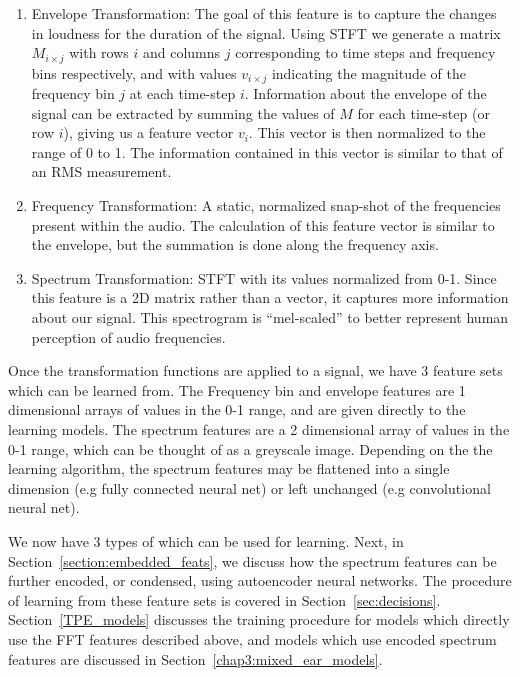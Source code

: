 \documentclass[\main/thesis.tex]{subfiles}
\begin{document}
\begin{enumerate}
\item Envelope Transformation: The goal of this feature is to capture the changes in loudness for the duration of the signal. Using STFT we generate a matrix $M_{i \times j}$ with rows $i$ and columns $j$ corresponding to time steps and frequency bins respectively, and with values $v_{i \times j}$ indicating the magnitude of the frequency bin $j$ at each time-step $i$. Information about the envelope of the signal can be extracted by summing the values of $M$ for each time-step (or row $i$), giving us a feature vector $v_i$. This vector is then normalized to the range of 0 to 1. The information contained in this vector is similar to that of an RMS measurement.
\item Frequency Transformation: A static, normalized snap-shot of the  frequencies present within the audio. The calculation of this feature vector is similar to the envelope, but the summation is done along the frequency axis.
\item Spectrum Transformation: STFT with its values normalized from 0-1. Since this feature is a 2D matrix rather than a vector, it captures more information about our signal. This spectrogram is \enquote{mel-scaled}\cite{stevens1940relation} to better represent human perception of audio frequencies.
\end{enumerate}

Once the transformation functions are applied to a signal, we have 3 feature sets which can be learned from. The Frequency bin and envelope features are 1 dimensional arrays of values in the 0-1 range, and are given directly to the learning models. The spectrum features are a 2 dimensional array of values in the 0-1 range, which can be thought of as a greyscale image. Depending on the the learning algorithm, the spectrum features may be flattened into a single dimension (e.g fully connected neural net) or left unchanged (e.g convolutional neural net). 

We now have 3 types of which can be used for learning. Next, in Section~\ref{section:embedded_feats}, we discuss how the spectrum features can be further encoded, or condensed, using autoencoder neural networks. The procedure of learning from these feature sets is covered in Section~\ref{sec:decisions}. Section~\ref{TPE_models} discusses the training procedure for models which directly use the FFT features described above, and models which use encoded spectrum features are discussed in Section~\ref{chap3:mixed_ear_models}.
\end{document}
